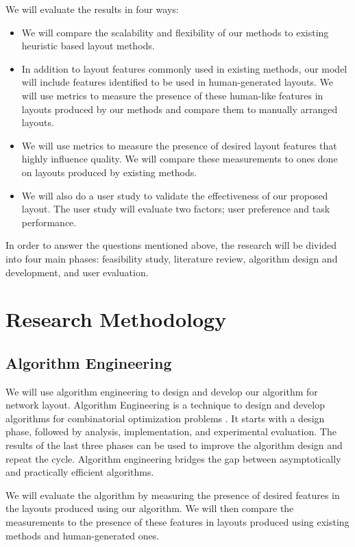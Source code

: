 \documentclass[a4paper,11pt,phdthesis,singlespace,twoside]{cssethesis}
\begin{document}
We will evaluate the results in four ways:
\begin{itemize}
\item We will compare the scalability and flexibility of our methods to existing heuristic based layout methods.
\item In addition to layout features commonly used in existing methods, our model will include features identified to be used in human-generated layouts. We will use metrics to measure the presence of these human-like features in layouts produced by our methods and compare them to manually arranged layouts.
\item We will use metrics to measure the presence of desired layout features that highly influence quality. We will compare these measurements to ones done on layouts produced by existing methods.
\item We will also do a user study to validate the effectiveness of our proposed layout. The user study will evaluate two factors; user preference and task performance.
\end{itemize}

In order to answer the questions mentioned above, the research will be divided into four main phases: feasibility study, literature review, algorithm design and development, and user evaluation.

\section{Research Methodology}

\subsection{Algorithm Engineering}
We will use algorithm engineering to design and develop our algorithm for network layout.
Algorithm Engineering is a technique to design and develop algorithms for combinatorial optimization problems \cite{chimani2010algorithm}. It starts with a design phase, followed by analysis, implementation, and experimental evaluation. The results of the last three phases can be used to improve the algorithm design and repeat the cycle. Algorithm engineering bridges the gap between asymptotically and practically efficient algorithms.

We will evaluate the algorithm by measuring the presence of desired features in the layouts produced using our algorithm. We will then compare the measurements to the presence of these features in layouts produced using existing methods and human-generated ones. 
\end{document}
